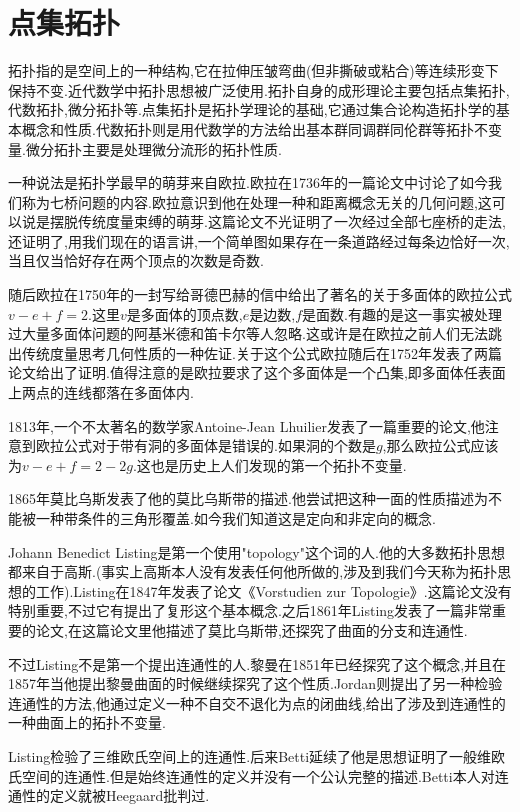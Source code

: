 \chapter{点集拓扑}

拓扑指的是空间上的一种结构,它在拉伸压皱弯曲(但非撕破或粘合)等连续形变下保持不变.近代数学中拓扑思想被广泛使用.拓扑自身的成形理论主要包括点集拓扑,代数拓扑,微分拓扑等.点集拓扑是拓扑学理论的基础,它通过集合论构造拓扑学的基本概念和性质.代数拓扑则是用代数学的方法给出基本群同调群同伦群等拓扑不变量.微分拓扑主要是处理微分流形的拓扑性质.

一种说法是拓扑学最早的萌芽来自欧拉.欧拉在1736年的一篇论文中讨论了如今我们称为七桥问题的内容.欧拉意识到他在处理一种和距离概念无关的几何问题,这可以说是摆脱传统度量束缚的萌芽.这篇论文不光证明了一次经过全部七座桥的走法,还证明了,用我们现在的语言讲,一个简单图如果存在一条道路经过每条边恰好一次,当且仅当恰好存在两个顶点的次数是奇数.

随后欧拉在1750年的一封写给哥德巴赫的信中给出了著名的关于多面体的欧拉公式$v-e+f=2$.这里$v$是多面体的顶点数,$e$是边数,$f$是面数.有趣的是这一事实被处理过大量多面体问题的阿基米德和笛卡尔等人忽略.这或许是在欧拉之前人们无法跳出传统度量思考几何性质的一种佐证.关于这个公式欧拉随后在1752年发表了两篇论文给出了证明.值得注意的是欧拉要求了这个多面体是一个凸集,即多面体任表面上两点的连线都落在多面体内.

1813年,一个不太著名的数学家Antoine-Jean Lhuilier发表了一篇重要的论文,他注意到欧拉公式对于带有洞的多面体是错误的.如果洞的个数是$g$,那么欧拉公式应该为$v-e+f=2-2g$.这也是历史上人们发现的第一个拓扑不变量.

1865年莫比乌斯发表了他的莫比乌斯带的描述.他尝试把这种一面的性质描述为不能被一种带条件的三角形覆盖.如今我们知道这是定向和非定向的概念.

Johann Benedict Listing是第一个使用"topology"这个词的人.他的大多数拓扑思想都来自于高斯.(事实上高斯本人没有发表任何他所做的,涉及到我们今天称为拓扑思想的工作).Listing在1847年发表了论文《Vorstudien zur Topologie》.这篇论文没有特别重要,不过它有提出了复形这个基本概念.之后1861年Listing发表了一篇非常重要的论文,在这篇论文里他描述了莫比乌斯带,还探究了曲面的分支和连通性.

不过Listing不是第一个提出连通性的人.黎曼在1851年已经探究了这个概念,并且在1857年当他提出黎曼曲面的时候继续探究了这个性质.Jordan则提出了另一种检验连通性的方法,他通过定义一种不自交不退化为点的闭曲线,给出了涉及到连通性的一种曲面上的拓扑不变量.

Listing检验了三维欧氏空间上的连通性.后来Betti延续了他是思想证明了一般维欧氏空间的连通性.但是始终连通性的定义并没有一个公认完整的描述.Betti本人对连通性的定义就被Heegaard批判过.

